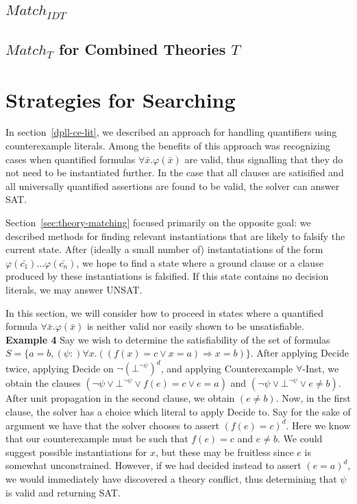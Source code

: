 \documentclass{llncs}
\begin{document}
\subsection{$Match_{IDT}$}

\subsection{$Match_{T}$ for Combined Theories $T$}

\section{Strategies for Searching}

In section~\ref{dpll-ce-lit}, we described an approach for handling quantifiers using counterexample literals.
Among the benefits of this approach was recognizing cases when quantified formulas $\forall \bar{x}. \varphi( \bar{x} )$ are valid, thus signalling that they do not need to be instantiated further.
In the case that all clauses are satisified and all universally quantified assertions are found to be valid, the solver can answer SAT.

Section~\ref{sec:theory-matching} focused primarily on the opposite goal: we described methods for finding relevant instantiations that are likely to falsify the current state.
After (ideally a small number of) instantatiations of the form $\varphi( \bar{c_1} ) \ldots \varphi( \bar{c_n} )$, we hope to find a state where a ground clause or a clause produced by these instantiations is falsified.
If this state contains no decision literals, we may answer UNSAT.

In this section, we will consider how to proceed in states where a quantified formula $\forall \bar{x}. \varphi( \bar{x} )$ is neither valid nor easily shown to be unsatisfiable. \\

{\bf Example 4} 
Say we wish to determine the satisfiability of the set of formulas $S = \{ a = b, (\psi :) \forall x. ((f(x) = c \vee x = a) \Rightarrow x = b) \}$.
After applying Decide twice, applying Decide on $\neg (\bot^{ \neg \psi })^d$, and applying Counterexample $\forall$-Inst, we obtain the clauses $( \neg \psi \vee \bot^{ \neg \psi } \vee f(e) = c \vee e = a )$ and $( \neg \psi \vee \bot^{ \neg \psi } \vee e \neq b )$.
After unit propagation in the second clause, we obtain $( e \neq b )$.
Now, in the first clause, the solver has a choice which literal to apply Decide to.
Say for the sake of argument we have that the solver chooses to assert $( f(e) = c )^d$.
Here we know that our counterexample must be such that $f( e ) = c$ and $e \neq b$.
We could suggest possible instantiations for $x$, but these may be fruitless since $e$ is somewhat unconstrained.
However, if we had decided instead to assert $( e = a )^d$, we would immediately have discovered a theory conflict, thus determining that $\psi$ is valid and returning SAT. \\
\end{document}
